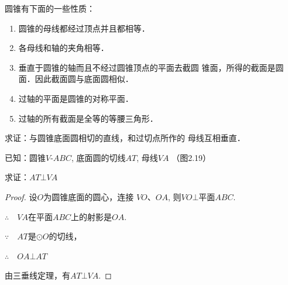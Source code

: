 圆锥有下面的一些性质：
\begin{enumerate}
\item 圆锥的母线都经过顶点并且都相等．
\item 各母线和轴的夹角相等．
\item 垂直于圆锥的轴而且不经过圆锥顶点的平面去截圆
锥面，所得的截面是圆面．因此截面圆与底面圆相似．
\item 过轴的平面是圆锥的对称平面．
\item 过轴的所有截面是全等的等腰三角形．
\end{enumerate}


\begin{example}
求证：与圆锥底面圆相切的直线，和过切点所作的
母线互相垂直．

已知：圆锥$V$-$ABC$, 底面圆的切线$AT$, 母线$VA$
（图2.19）

\begin{figure}[htp]
    \centering
{}
    \caption{}
\end{figure}

求证：$AT\bot VA$
\end{example}

\begin{proof}
设$O$为圆锥底面的圆心，连接
$VO$、$OA$, 则$VO\bot$平面$ABC$.

$\therefore\quad VA$在平面$ABC$上的射影是$OA$.

$\because\quad AT$是$\odot O$的切线，

$\therefore\quad OA\bot AT$

由三垂线定理，有$AT\bot VA$.
\end{proof}

